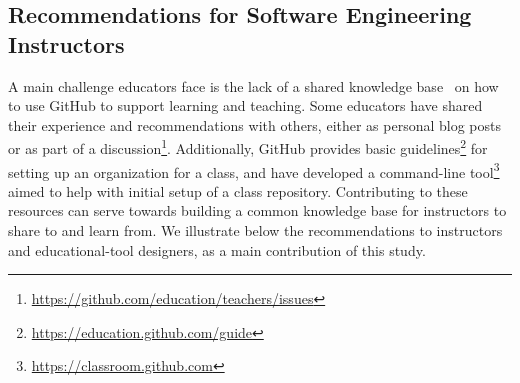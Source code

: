 \subsection{Recommendations for Software Engineering Instructors}

A main challenge educators face is the lack of a shared knowledge base~\cite{zagalsky2015emergence} on how to use GitHub to support learning and teaching. Some educators have shared their experience and recommendations with others, either as personal blog posts or as part of a discussion\footnote{\url{https://github.com/education/teachers/issues}}. Additionally, GitHub provides basic guidelines\footnote{\url{https://education.github.com/guide}} for setting up an organization for a class, and have developed a command-line tool\footnote{\url{https://classroom.github.com}} aimed to help with initial setup of a class repository. Contributing to these resources can serve towards building a common knowledge base for instructors to share to and learn from. We illustrate below the recommendations to instructors and educational-tool designers, as a main contribution of this study.

